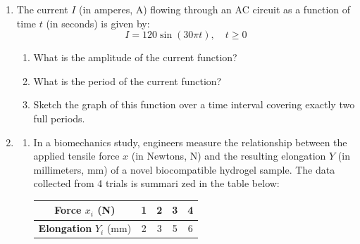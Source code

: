 \documentclass[11pt,svgnames,spanish,oneside]{amsart}
\begin{document}
\begin{enumerate}[label=\textbf{P\arabic*.},itemsep=1em]
  Suppose a bioengineer monitors a cell culture population and determines that the carrying capacity is $K = 30$ million cells. The population data at key checkpoints is recorded as follows:
  \begin{center}
    $N(0) = 10$ million cells \quad and \quad $N(5) = 22$ million cells.
  \end{center}

  \begin{enumerate}
    \item Use the provided formula and the data points at $t = 0$ and $t = 5$ to estimate the exact value of the intrinsic growth rate $r$. \textit{(Leave your answer in terms of natural logarithms or round to four decimal places.)}
    \item Using your calculated value of $r$ and the explicit solution model, project the expected cell population size at $t = 10$ hours.
  \end{enumerate}

  \medskip
  \item The current $I$ (in amperes, A) flowing through an AC circuit as a function of time $t$ (in seconds) is given by:
  $$ I = 120 \sin(30\pi t), \quad t \ge 0 $$

  \begin{enumerate}
    \item What is the amplitude of the current function?
    \item What is the period of the current function?
    \item Sketch the graph of this function over a time interval covering exactly two full periods.
  \end{enumerate}

  \medskip
  \item
  \begin{enumerate}
   \item
   In a biomechanics study, engineers measure the relationship between the applied tensile force $x$ (in Newtons, N) and the resulting elongation $Y$ (in millimeters, mm) of a novel biocompatible hydrogel sample. The data collected from 4 trials is summari zed in the table below:

  \begin{center}
  \begin{tabular}{|c|c|c|c|c|}
    \hline
    \textbf{Force } $x_i$ (N) & 1 & 2 & 3 & 4 \\ \hline
    \textbf{Elongation } $Y_i$ (mm) & 2 & 3 & 5 & 6 \\ \hline
  \end{tabular}
  \end{center}


\end{enumerate}
\end{enumerate}
\end{document}
